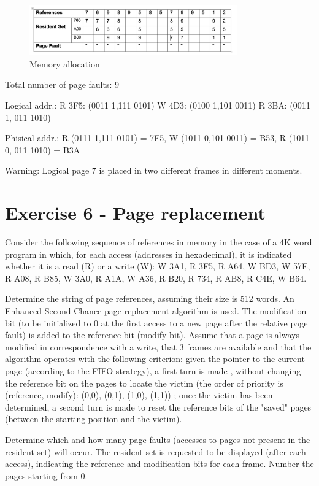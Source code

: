 \begin{figure}[hbt]
  \includegraphics[width=0.8\textwidth]{images/ex05.png}
  \caption{Memory allocation}
\end{figure}

Total number of page faults: 9

Logical addr.:  R 3F5: (0011 1,111 0101)  W 4D3: (0100 1,101 0011) R 3BA: (0011 1, 011 1010)

Phisical addr.:  R  (0111 1,111 0101) = 7F5,  W (1011 0,101 0011) = B53,  R  (1011 0, 011 1010) = B3A

Warning: Logical page 7 is placed in two different frames in different moments. 



\section{Exercise 6 - Page replacement}

Consider the following sequence of references in memory in the case of a 4K word program in which, for each access (addresses in hexadecimal), it is indicated whether it is a read (R) or a write (W): W 3A1, R 3F5, R A64, W BD3, W 57E, R A08, R B85, W 3A0, R A1A, W A36, R B20, R 734, R AB8, R C4E, W B64.

Determine the string of page references, assuming their size is 512 words. An Enhanced Second-Chance page replacement algorithm is used. The modification bit (to be initialized to 0 at the first access to a new page after the relative page fault) is added to the reference bit (modify bit). Assume that a page is always modified in correspondence with a write, that 3 frames are available and that the algorithm operates with the following criterion: given the pointer to the current page (according to the FIFO strategy), a first turn is made , without changing the reference bit on the pages to locate the victim (the order of priority is (reference, modify): (0,0), (0,1), (1,0), (1,1)) ; once the victim has been determined, a second turn is made to reset the reference bits of the "saved" pages (between the starting position and the victim).

Determine which and how many page faults (accesses to pages not present in the resident set) will occur. The resident set is requested to be displayed (after each access), indicating the reference and modification bits for each frame. Number the pages starting from 0.

